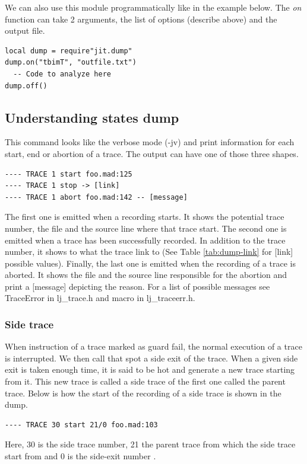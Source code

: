 We can also use this module programmatically like in the example below. The
\emph{on} function can take 2 arguments, the list of options (describe above)
and the output file.
\begin{lstlisting}[style=LuaStyle]
local dump = require"jit.dump"
dump.on("tbimT", "outfile.txt")
  -- Code to analyze here
dump.off()
\end{lstlisting}


\subsection{Understanding states dump}
\label{Subsec:dump-states}

This command looks like the verbose mode (-jv) and print information for each start,
end or abortion of a trace. The output can have one of those three shapes.
\begin{verbatim}
---- TRACE 1 start foo.mad:125
---- TRACE 1 stop -> [link]
---- TRACE 1 abort foo.mad:142 -- [message]
\end{verbatim}
The first one is emitted when a recording starts. It shows the potential
trace number, the file and the source line where that trace start.
The second one is emitted when a trace has been successfully recorded. In
addition to the trace number, it shows to what the trace link to (See Table
\ref{tab:dump-link} for [link] possible values). Finally, the last one is emitted
when the recording of a trace is aborted. It shows the file and the source line
responsible for the abortion and print a [message] depicting the reason. For
a list of possible messages see TraceError in lj\_trace.h and macro in
lj\_traceerr.h.

\subsubsection{Side trace}
When instruction of a trace marked as guard fail, the normal execution of a
trace is interrupted. We then call that spot a side exit of the trace. When a
given side exit is taken enough time, it is said to be hot and generate a new
trace starting from it. This new trace is called a side trace of the first one
called the parent trace. Below is how the start of the recording of a side
trace is shown in the dump.
\begin{verbatim}
---- TRACE 30 start 21/0 foo.mad:103
\end{verbatim}
Here, 30 is the side trace number, 21 the parent trace from which the side trace
start from and 0 is the side-exit number .

